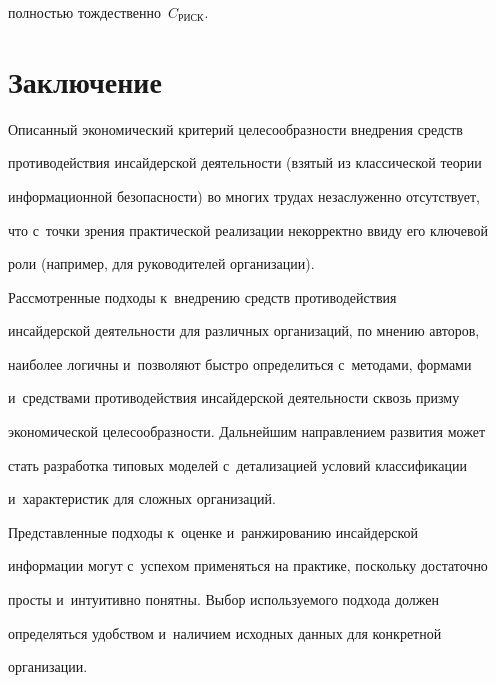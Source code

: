 полностью тождественно~$C_{\mathrm{РИСК}}$.


     


\section{Заключение}





     Описанный экономический критерий целесообразности внедрения средств 


противодействия инсайдерской деятельности (взятый из классической теории 


информационной безопасности) во многих трудах незаслуженно отсутствует, 


что с~точки зрения практической реализации некорректно ввиду его ключевой 


роли (например, для руководителей организации).


     


     Рассмотренные подходы к~внедрению средств противодействия 


инсайдерской деятельности для различных организаций, по мнению авторов, 


наиболее логичны и~позволяют быстро определиться с~методами, формами 


и~средствами противодействия инсайдерской деятельности сквозь призму 


экономической целесообразности. Дальнейшим направлением развития может 


стать разработка типовых моделей с~детализацией условий классификации 


и~характеристик для сложных организаций. 


     


     Представленные подходы к~оценке и~ранжированию инсайдерской 


информации могут с~успехом применяться на практике, поскольку достаточно 


просты и~интуитивно понятны. Выбор используемого подхода должен 


определяться удобством и~наличием исходных данных для конкретной 


организации.


     


